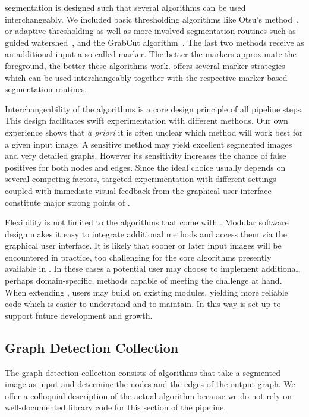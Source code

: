 		\NEFIs segmentation is designed such that several algorithms can be used interchangeably. We included basic thresholding algorithms like Otsu's method~\cite{otsu1979}, or adaptive thresholding as well as more involved segmentation routines such as guided watershed~\cite{watershed91}, and the GrabCut algorithm~\cite{grabcut2004}. The last two methods receive as an additional input a so-called marker. The better the markers approximate the foreground, the better these algorithms work. \NEFI offers several marker strategies which can be used interchangeably together with the respective marker based segmentation routines. 

		Interchangeability of the algorithms is a core design principle of all pipeline steps. This design facilitates swift experimentation with different methods. Our own experience shows that \emph{a priori} it is often unclear which method will work best for a given input image. A sensitive method may yield excellent segmented images and very detailed graphs. However its sensitivity increases the chance of false positives for both nodes and edges. Since the ideal choice usually depends on several competing factors, targeted experimentation with different settings coupled with immediate visual feedback from the graphical user interface constitute major strong points of \NEFI.

		Flexibility is not limited to the algorithms that come with \NEFI. Modular software design makes it easy to integrate additional methods and access them via the graphical user interface. It is likely that sooner or later input images will be encountered in practice, too challenging for the core algorithms presently available in \NEFI. In these cases a potential user may choose to implement additional, perhaps domain-specific, methods capable of meeting the challenge at hand. When extending \NEFI, users may build on existing modules, yielding more reliable code which is easier to understand and to maintain. In this way \NEFI is set up to support future development and growth.

	\subsection{Graph Detection Collection} 

		The graph detection collection consists of algorithms that take a segmented image as input and determine the nodes and the edges of the output graph. We offer a colloquial description of the actual algorithm because we do not rely on well-documented library code for this section of the pipeline. 


